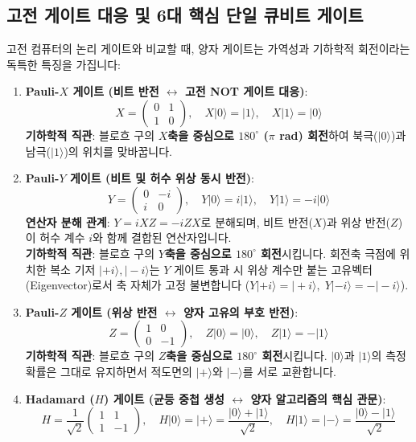 \documentclass[11pt, a4paper]{article}
\newcommand{\ket}[1]{|#1\rangle}
\theoremstyle{definition}
\begin{document}
\subsection{고전 게이트 대응 및 6대 핵심 단일 큐비트 게이트}
고전 컴퓨터의 논리 게이트와 비교할 때, 양자 게이트는 가역성과 기하학적 회전이라는 독특한 특징을 가집니다:
\begin{enumerate}
    \item \textbf{Pauli-$X$ 게이트 (비트 반전 $\leftrightarrow$ 고전 NOT 게이트 대응)}:
    $$X = \begin{pmatrix} 0 & 1 \\ 1 & 0 \end{pmatrix}, \quad X\ket{0} = \ket{1}, \quad X\ket{1} = \ket{0}$$
    \textbf{기하학적 직관}: 블로흐 구의 \textbf{$X$축을 중심으로 $180^\circ$ ($\pi$ rad) 회전}하여 북극($\ket{0}$)과 남극($\ket{1}$)의 위치를 맞바꿉니다.
    \item \textbf{Pauli-$Y$ 게이트 (비트 및 허수 위상 동시 반전)}:
    $$Y = \begin{pmatrix} 0 & -i \\ i & 0 \end{pmatrix}, \quad Y\ket{0} = i\ket{1}, \quad Y\ket{1} = -i\ket{0}$$
    \textbf{연산자 분해 관계}: $Y = i X Z = -i Z X$로 분해되며, 비트 반전($X$)과 위상 반전($Z$)이 허수 계수 $i$와 함께 결합된 연산자입니다.\\
    \textbf{기하학적 직관}: 블로흐 구의 \textbf{$Y$축을 중심으로 $180^\circ$ 회전}시킵니다. 회전축 극점에 위치한 복소 기저 $\ket{+i}, \ket{-i}$는 $Y$ 게이트 통과 시 위상 계수만 붙는 고유벡터(Eigenvector)로서 축 자체가 고정 불변합니다 ($Y\ket{+i} = \ket{+i}, \; Y\ket{-i} = -\ket{-i}$).
    \item \textbf{Pauli-$Z$ 게이트 (위상 반전 $\leftrightarrow$ 양자 고유의 부호 반전)}:
    $$Z = \begin{pmatrix} 1 & 0 \\ 0 & -1 \end{pmatrix}, \quad Z\ket{0} = \ket{0}, \quad Z\ket{1} = -\ket{1}$$
    \textbf{기하학적 직관}: 블로흐 구의 \textbf{$Z$축을 중심으로 $180^\circ$ 회전}시킵니다. $\ket{0}$과 $\ket{1}$의 측정 확률은 그대로 유지하면서 적도면의 $\ket{+}$와 $\ket{-}$를 서로 교환합니다.
    \item \textbf{Hadamard ($H$) 게이트 (균등 중첩 생성 $\leftrightarrow$ 양자 알고리즘의 핵심 관문)}:
    $$H = \frac{1}{\sqrt{2}}\begin{pmatrix} 1 & 1 \\ 1 & -1 \end{pmatrix}, \quad H\ket{0} = \ket{+} = \frac{\ket{0}+\ket{1}}{\sqrt{2}}, \quad H\ket{1} = \ket{-} = \frac{\ket{0}-\ket{1}}{\sqrt{2}}$$

\end{enumerate}
\end{document}

